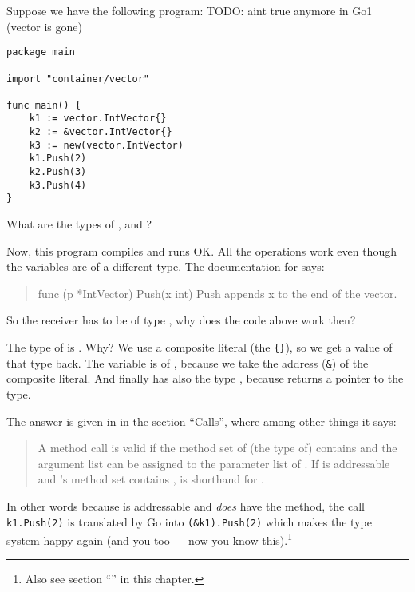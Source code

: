 \begin{Exercise}[title={Method calls},difficulty=8]
\label{ex:methodcalls}
\Question \label{ex:methodcalls q1} Suppose we have the following
program: TODO: aint true anymore in Go1 (vector is gone)
\begin{lstlisting}
package main

import "container/vector"

func main() {
	k1 := vector.IntVector{}
	k2 := &vector.IntVector{}
	k3 := new(vector.IntVector)
	k1.Push(2)
	k2.Push(3)
	k3.Push(4)
}
\end{lstlisting}
What are the types of ,  and ?

\Question Now, this program compiles and runs OK. All the 
operations work even though the variables are of a different type. The
documentation for  says:
\begin{quote}
func (p *IntVector) Push(x int)
Push appends x to the end of the vector.
\end{quote}
So the receiver has to be of type , why does the code
above work then?

\end{Exercise}

\begin{Answer}
\Question The type of  is . Why? We use 
a composite literal (the \verb|{}|), so we get a value of that type
back. The variable  is of , because we
take the address (\verb|&|) of the composite literal. And finally
 has also the type , because 
returns a pointer to the type.

\Question The answer is given in \cite{go_spec} in the section ``Calls'',
where among other things it says:
\begin{quote}
A method call  is valid if the method set of (the type of)
contains  and the argument list can be assigned to the parameter list
of . If  is addressable and 's method set
contains ,  is shorthand for .
\end{quote}
In other words because  is addressable and
 \emph{does} have the  method, the
call \lstinline{k1.Push(2)} is translated by Go into 
\lstinline{(&k1).Push(2)} which makes the type system happy again (and
you too --- now you know this).\footnote{Also see section
``'' in this chapter.}

\end{Answer}
